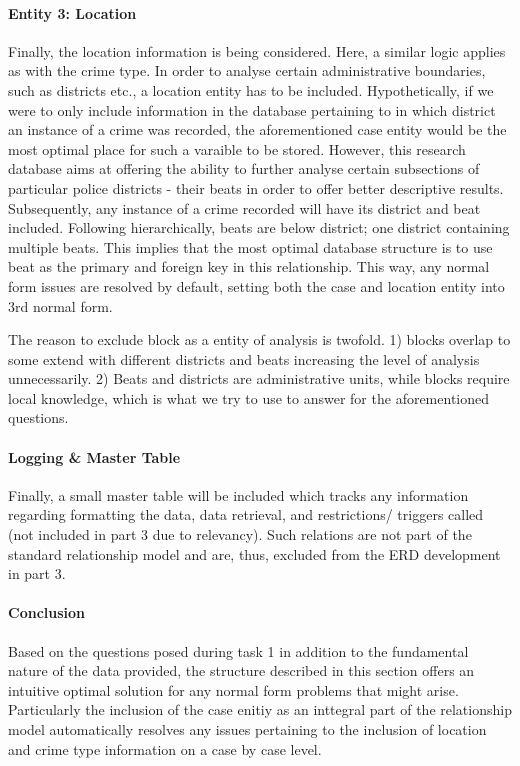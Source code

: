 \documentclass[a4paper]{article}
\begin{document}
\paragraph{Entity 3: Location} Finally, the location information is being considered. Here, a similar logic applies as with the crime type. In order to analyse certain administrative boundaries, such as districts etc., a location entity has to be included. Hypothetically, if we were to only include information in the database pertaining to in which district an instance of a crime was recorded, the aforementioned case entity would be the most optimal place for such a varaible to be stored. However, this research database aims at offering the ability to further analyse certain subsections of particular police districts - their beats in order to offer better descriptive results. 
Subsequently, any instance of a crime recorded will have its district and beat included. Following hierarchically, beats are below district; one district containing multiple beats. This implies that the most optimal database structure is to use beat as the primary and foreign key in this relationship. This way, any normal form issues are resolved by default, setting both the case and location entity into 3rd normal form. 

The reason to exclude block as a entity of analysis is twofold. 1) blocks overlap to some extend with different districts and beats increasing the level of analysis unnecessarily. 2) Beats and districts are administrative units, while blocks require local knowledge, which is what we try to use to answer for the aforementioned questions. 


\paragraph{Logging \& Master Table} Finally, a small master table will be included which tracks any information regarding formatting the data, data retrieval, and restrictions/ triggers called (not included in part 3 due to relevancy). Such relations are not part of the standard relationship model and are, thus, excluded from the ERD development in part 3. 


\paragraph{Conclusion} Based on the questions posed during task 1 in addition to the fundamental nature of the data provided, the structure described in this section offers an intuitive optimal solution for any normal form problems that might arise. Particularly the inclusion of the case enitiy as an inttegral part of the relationship model automatically resolves any issues pertaining to the inclusion of location and crime type information on a case by case level. 
\end{document}
